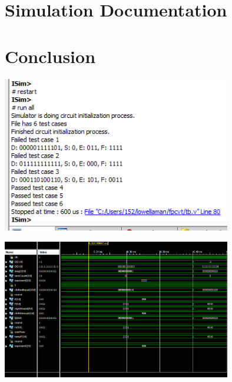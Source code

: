 \documentclass[]{article}
\begin{document}
\section{Simulation Documentation}
\section{Conclusion}


\includegraphics[width=10cm]{output.PNG}

\includegraphics[width=10cm]{waveform.PNG}




\end{document}

